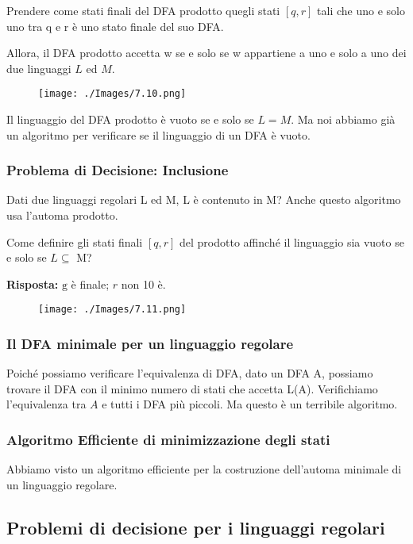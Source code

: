 Prendere come stati finali del DFA prodotto quegli stati $[q, r]$ tali che uno e solo uno tra q e r è uno stato finale del suo DFA.

Allora, il DFA prodotto accetta w se e solo se w appartiene a uno e solo a uno dei due linguaggi $L$ ed $M$.

\begin{figure}[hbpt!]
    \centering
    \texttt{[image: ./Images/7.10.png]}
\end{figure}
\FloatBarrier

Il linguaggio del DFA prodotto è vuoto
se e solo se $L = M$. Ma noi abbiamo già un algoritmo per
verificare se il linguaggio di un DFA è
vuoto.

\subsubsection{Problema di Decisione: Inclusione}

Dati due linguaggi regolari L ed M, L è contenuto in M?
Anche questo algoritmo usa l'automa prodotto.

Come definire gli stati finali $[q, r]$ del prodotto affinché il linguaggio sia vuoto se e solo se $L \subseteq$ M?

\textbf{Risposta:} $\mathrm{g}$ è finale; $r$ non 10 è.

\begin{figure}[hbpt!]
    \centering
    \texttt{[image: ./Images/7.11.png]}
\end{figure}
\FloatBarrier

\subsubsection{Il DFA minimale per un linguaggio
regolare}

Poiché possiamo verificare l'equivalenza di DFA, dato un DFA A, possiamo trovare il DFA con il minimo numero di stati che accetta L(A).
Verifichiamo l'equivalenza tra $A$ e tutti i DFA più piccoli.
Ma questo è un terribile algoritmo.

\subsubsection{Algoritmo Efficiente di
minimizzazione degli stati}

Abbiamo visto un algoritmo efficiente
per la costruzione dell’automa
minimale di un linguaggio regolare.

\subsection{Problemi di decisione per i linguaggi regolari}

